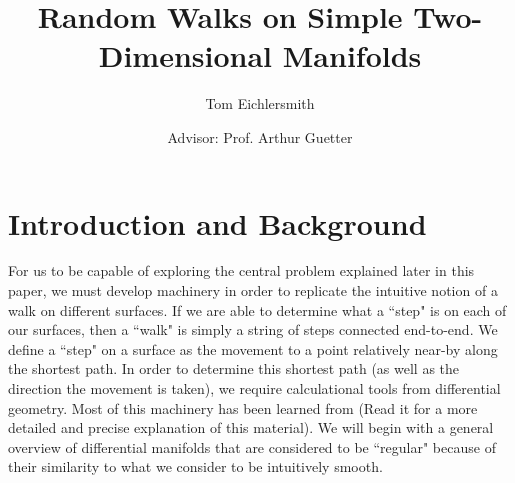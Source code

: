 \documentclass{article}
\title{Random Walks on Simple Two-Dimensional Manifolds}
\author{Tom Eichlersmith \and Advisor: Prof. Arthur Guetter}
\begin{document}
	
\maketitle

\section{Introduction and Background}
	For us to be capable of exploring the central problem explained later in this paper, we must develop machinery in order to replicate the intuitive notion of a walk on different surfaces.
	If we are able to determine what a ``step" is on each of our surfaces, then a ``walk" is simply a string of steps connected end-to-end.
	We define a ``step" on a surface as the movement to a point relatively near-by along the shortest path.
	In order to determine this shortest path (as well as the direction the movement is taken), we require calculational tools from differential geometry.
	Most of this machinery has been learned from \cite{BanchoffLovett_DiffGeo_2010} (Read it for a more detailed and precise explanation of this material).
	We will begin with a general overview of differential manifolds that are considered to be ``regular" because of their similarity to what we consider to be intuitively smooth.
	
\end{document}
